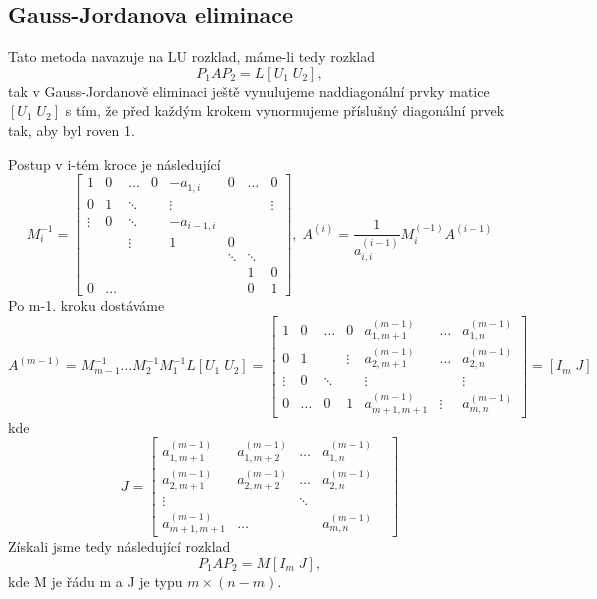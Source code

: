 \documentclass{article}
\theoremstyle{plain}
\theoremstyle{definition}
\begin{document}
\subsection{Gauss-Jordanova eliminace}
Tato metoda navazuje na LU rozklad, máme-li tedy rozklad \[P_1AP_2=L[U_1 \; U_2],\] tak v Gauss-Jordanově eliminaci ještě vynulujeme naddiagonální prvky matice $[U_1 \; U_2]$ s tím, že před každým krokem vynormujeme příslušný diagonální prvek tak, aby byl roven 1.

Postup v i-tém kroce je následující
\[
M_i^{-1} = \begin{bmatrix}
    1 & 0 & \hdots & 0 & -a_{1,i}&0 &\hdots & 0 \\
    0 & 1 & \ddots & & \vdots & & & \vdots   \\
    \vdots & 0 & \ddots & & -a_{i-1,i} & & \\
    & & \vdots & & 1 & 0 & \\
    & & & & & \ddots & \ddots& \\
    & & & & & & 1 & 0 \\
    0& \hdots & & & & & 0 & 1
\end{bmatrix}, \; A^{(i)} = \frac{1}{a_{i,i}^{(i-1)}}M_i^{(-1)}A^{(i-1)}
\]
Po m-1. kroku dostáváme
\[ A^{(m-1)} = M_{m-1}^{-1} \hdots M_2^{-1}M_1^{-1}L[U_1\; U_2] = \begin{bmatrix}
    1 & 0 & \hdots & 0 & a_{1,m+1}^{(m-1)} & \hdots & a_{1,n}^{(m-1)} \\
    0 & 1 & & \vdots & a_{2,m+1}^{(m-1)} & \hdots & a_{2,n}^{(m-1)} \\
    \vdots & 0 & \ddots & & \vdots & & \vdots \\
    0 & \hdots & 0 & 1 & a_{m+1,m+1}^{(m-1)} & \vdots & a_{m,n}^{(m-1)}
\end{bmatrix}
= [I_m \; J]
\]
kde
\[J=\begin{bmatrix}
    a_{1,m+1}^{(m-1)} & a_{1,m+2}^{(m-1)} & \hdots & a_{1,n}^{(m-1)} \\
    a_{2,m+1}^{(m-1)} & a_{2,m+2}^{(m-1)} & \hdots & a_{2,n}^{(m-1)} \\
    \vdots & &\ddots & & \\
    a_{m+1,m+1}^{(m-1)}& \hdots & & a_{m,n}^{(m-1)}
\end{bmatrix}
\]
Získali jsme tedy následující rozklad 
\[ P_1 A P_2 = M [I_m \; J]
,\]
kde M je řádu m a J je typu $m \times (n-m)$.
\end{document}
